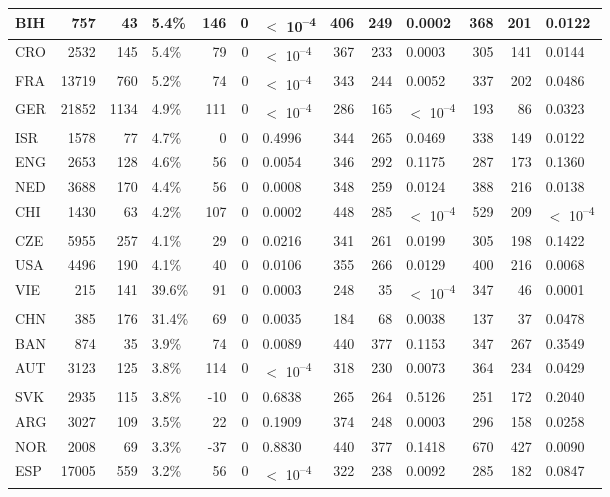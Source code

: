 \begin{tabular}{l|r|r|l|r|r|l|r|r|l|r|r|l}
\hline
BIH & 757 & 43 & 5.4\% & 146 & 0 & $<$ 10\textsuperscript{--4} & 406 & 249 & 0.0002 & 368 & 201 & 0.0122\\
\hline
CRO & 2532 & 145 & 5.4\% & 79 & 0 & $<$ 10\textsuperscript{--4} & 367 & 233 & 0.0003 & 305 & 141 & 0.0144\\
\hline
FRA & 13719 & 760 & 5.2\% & 74 & 0 & $<$ 10\textsuperscript{--4} & 343 & 244 & 0.0052 & 337 & 202 & 0.0486\\
\hline
GER & 21852 & 1134 & 4.9\% & 111 & 0 & $<$ 10\textsuperscript{--4} & 286 & 165 & $<$ 10\textsuperscript{--4} & 193 & 86 & 0.0323\\
\hline
ISR & 1578 & 77 & 4.7\% & 0 & 0 & 0.4996 & 344 & 265 & 0.0469 & 338 & 149 & 0.0122\\
\hline
ENG & 2653 & 128 & 4.6\% & 56 & 0 & 0.0054 & 346 & 292 & 0.1175 & 287 & 173 & 0.1360\\
\hline
NED & 3688 & 170 & 4.4\% & 56 & 0 & 0.0008 & 348 & 259 & 0.0124 & 388 & 216 & 0.0138\\
\hline
CHI & 1430 & 63 & 4.2\% & 107 & 0 & 0.0002 & 448 & 285 & $<$ 10\textsuperscript{--4} & 529 & 209 & $<$ 10\textsuperscript{--4}\\
\hline
CZE & 5955 & 257 & 4.1\% & 29 & 0 & 0.0216 & 341 & 261 & 0.0199 & 305 & 198 & 0.1422\\
\hline
USA & 4496 & 190 & 4.1\% & 40 & 0 & 0.0106 & 355 & 266 & 0.0129 & 400 & 216 & 0.0068\\
\hline
VIE & 215 & 141 & 39.6\% & 91 & 0 & 0.0003 & 248 & 35 & $<$ 10\textsuperscript{--4} & 347 & 46 & 0.0001\\
\hline
CHN & 385 & 176 & 31.4\% & 69 & 0 & 0.0035 & 184 & 68 & 0.0038 & 137 & 37 & 0.0478\\
\hline
BAN & 874 & 35 & 3.9\% & 74 & 0 & 0.0089 & 440 & 377 & 0.1153 & 347 & 267 & 0.3549\\
\hline
AUT & 3123 & 125 & 3.8\% & 114 & 0 & $<$ 10\textsuperscript{--4} & 318 & 230 & 0.0073 & 364 & 234 & 0.0429\\
\hline
SVK & 2935 & 115 & 3.8\% & -10 & 0 & 0.6838 & 265 & 264 & 0.5126 & 251 & 172 & 0.2040\\
\hline
ARG & 3027 & 109 & 3.5\% & 22 & 0 & 0.1909 & 374 & 248 & 0.0003 & 296 & 158 & 0.0258\\
\hline
NOR & 2008 & 69 & 3.3\% & -37 & 0 & 0.8830 & 440 & 377 & 0.1418 & 670 & 427 & 0.0090\\
\hline
ESP & 17005 & 559 & 3.2\% & 56 & 0 & $<$ 10\textsuperscript{--4} & 322 & 238 & 0.0092 & 285 & 182 & 0.0847\\

\end{tabular}
